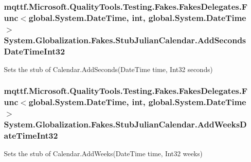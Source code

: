\hypertarget{class_system_1_1_globalization_1_1_fakes_1_1_stub_julian_calendar_a09868f08cb4cd22cd8d55695b7ec2a10}{
\subsubsection[{Add\-Seconds\-Date\-Time\-Int32}]{\setlength{\rightskip}{0pt plus 5cm}mqttf.\-Microsoft.\-Quality\-Tools.\-Testing.\-Fakes.\-Fakes\-Delegates.\-Func$<$global.\-System.\-Date\-Time, int, global.\-System.\-Date\-Time$>$ System.\-Globalization.\-Fakes.\-Stub\-Julian\-Calendar.\-Add\-Seconds\-Date\-Time\-Int32}}\label{class_system_1_1_globalization_1_1_fakes_1_1_stub_julian_calendar_a09868f08cb4cd22cd8d55695b7ec2a10}


Sets the stub of Calendar.\-Add\-Seconds(\-Date\-Time time, Int32 seconds)

\hypertarget{class_system_1_1_globalization_1_1_fakes_1_1_stub_julian_calendar_a42a0e6b24848fb845b97b05bd5569b4c}{
\subsubsection[{Add\-Weeks\-Date\-Time\-Int32}]{\setlength{\rightskip}{0pt plus 5cm}mqttf.\-Microsoft.\-Quality\-Tools.\-Testing.\-Fakes.\-Fakes\-Delegates.\-Func$<$global.\-System.\-Date\-Time, int, global.\-System.\-Date\-Time$>$ System.\-Globalization.\-Fakes.\-Stub\-Julian\-Calendar.\-Add\-Weeks\-Date\-Time\-Int32}}\label{class_system_1_1_globalization_1_1_fakes_1_1_stub_julian_calendar_a42a0e6b24848fb845b97b05bd5569b4c}


Sets the stub of Calendar.\-Add\-Weeks(\-Date\-Time time, Int32 weeks)

